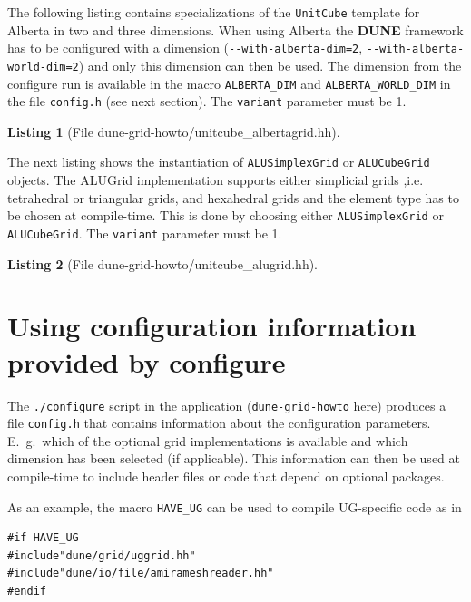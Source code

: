 \documentclass[11pt,a4paper,headinclude,footinclude,DIV16,normalheadings]{scrreprt}
\newcommand{\Dune}{{\sf\bfseries DUNE}}
\newtheorem{lst}{Listing}
\begin{document}

The following listing contains specializations of the
\lstinline!UnitCube! template for Alberta in two and three
dimensions. When using Alberta the \Dune{} framework has to be
configured with a dimension (\lstinline!--with-alberta-dim=2!,
\lstinline!--with-alberta-world-dim=2!) and only this dimension can then be
used. 
The dimension from the configure run is available in the macro
\lstinline!ALBERTA_DIM! and \lstinline!ALBERTA_WORLD_DIM! 
in the file \lstinline!config.h! (see
next section). The \lstinline!variant! parameter must be 1.

\begin{lst}[File dune-grid-howto/unitcube\_albertagrid.hh] \mbox{}
\nopagebreak

\end{lst}


The next listing shows the instantiation of \lstinline!ALUSimplexGrid! or 
\lstinline!ALUCubeGrid! objects. 
The ALUGrid implementation supports either simplicial grids ,i.e. 
tetrahedral or triangular grids, and hexahedral grids and the
element type has to be chosen at compile-time. This is done by choosing 
either \lstinline!ALUSimplexGrid! or \lstinline!ALUCubeGrid!. 
The \lstinline!variant! parameter must be 1. 

\begin{lst}[File dune-grid-howto/unitcube\_alugrid.hh] \mbox{}
\nopagebreak

\end{lst}

\section{Using configuration information provided by configure}

The \lstinline!./configure! script in the application
(\lstinline!dune-grid-howto! here) produces a file
\lstinline!config.h! that contains information about the configuration
parameters. E.~g.~which of the optional grid implementations is
available and which dimension has been selected (if applicable). This
information can then be used at compile-time to include header files
or code that depend on optional packages.

As an example, the macro \lstinline!HAVE_UG! can be used to compile
UG-specific code as in
\begin{lstlisting}[basicstyle=\ttfamily\scriptsize]
#if HAVE_UG
#include"dune/grid/uggrid.hh"
#include"dune/io/file/amirameshreader.hh"
#endif
\end{lstlisting}
\end{document}
